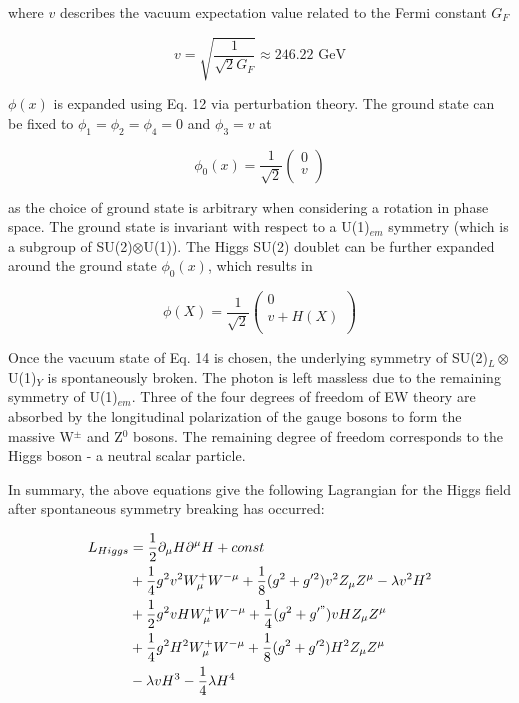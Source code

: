 \documentclass[12pt,a4paper,epsf,portrait,times,epsfig]{article}
\begin{document}
		where $v$ describes the vacuum expectation value related to the Fermi constant $G_{F}$
		
		\begin{equation}
			v = \sqrt{\frac{1}{\sqrt{2}G_{F}}} \approx 246.22 \text{ GeV}
		\end{equation}
		
		$\phi(x)$ is expanded using Eq. 12 via perturbation theory. The ground state can be fixed to $\phi_{1}=\phi_{2}=\phi_{4} = 0$ and $\phi_{3} = v$ at
		
		\begin{equation}
			\phi_{0}(x) = \frac{1}{\sqrt{2}}\begin{pmatrix}
			0 \\
			v \\
			\end{pmatrix}
		\end{equation}
		
		as the choice of ground state is arbitrary when considering a rotation in phase space. The ground state is invariant with respect to a U(1)$_{em}$ symmetry (which is a subgroup of SU(2)$\otimes $U(1)). The Higgs SU(2) doublet can be further expanded around the ground state $\phi_{0}(x)$, which results in 
		
		\begin{equation}
			\phi(X) = \frac{1}{\sqrt{2}}\begin{pmatrix}
			0 \\
			v + H(X) \\
			\end{pmatrix}
		\end{equation}
		
		Once the vacuum state of Eq. 14 is chosen, the underlying symmetry of SU(2)$_{L} \otimes$ U(1)$_{Y}$ is spontaneously broken. The photon is left massless due to the remaining symmetry of U(1)$_{em}$. Three of the four degrees of freedom of EW theory are absorbed by the longitudinal polarization of the gauge bosons to form the massive W$^{\pm}$ and Z$^{0}$ bosons. The remaining degree of freedom corresponds to the Higgs boson - a neutral scalar particle. \par
		In summary, the above equations give the following Lagrangian for the Higgs field after spontaneous symmetry breaking has occurred:
		
		\begin{align}
		\begin{split}
		L_{Higgs} &= \frac{1}{2}\partial_{\mu}H\partial^{\mu}H + const \\
		&+\frac{1}{4}g^{2}v^{2}W_{\mu}^{+}W^{-\mu}+\frac{1}{8}(g^{2}+g'^{2})v^{2}Z_{\mu}Z^{\mu}-\lambda v^{2}H^{2} \\
		&+\frac{1}{2}g^{2}vHW_{\mu}^{+}W^{-\mu} + \frac{1}{4}(g^{2}+g'^{"})vHZ_{\mu}Z^{\mu} \\
		&+\frac{1}{4}g^{2}H^{2}W_{\mu}^{+}W^{-\mu}+\frac{1}{8}(g^{2}+g'^{2})H^{2}Z_{\mu}Z^{\mu} \\
		&-\lambda vH^{3}-\frac{1}{4}\lambda H^{4}
		\end{split}
		\end{align}
		
\end{document}
